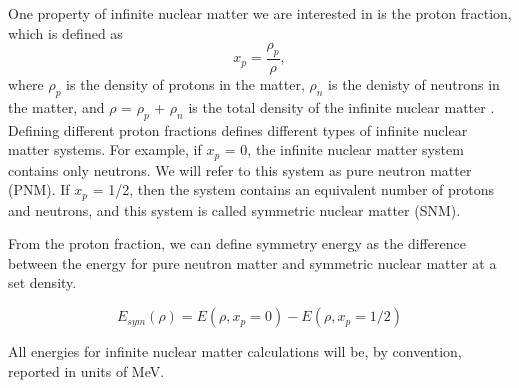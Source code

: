 One property of infinite nuclear matter we are interested in is the proton fraction, which is defined as 
\begin{equation}\label{proton_fraction}
    x_p = \frac{\rho_p}{\rho},
\end{equation}
where $\rho_p$ is the density of protons in the matter, $\rho_n$ is the denisty of neutrons in the matter, and $\rho$ = $\rho_p$ + $\rho_n$ is the total density of the infinite nuclear matter \cite{Ref3}.  Defining different proton fractions defines different types of infinite nuclear matter systems. For example, if $x_p$ = 0, the infinite nuclear matter system contains only neutrons. We will refer to this system as pure neutron matter (PNM). If $x_p$ = 1/2, then the system contains an equivalent number of protons and neutrons, and this system is called symmetric nuclear matter (SNM). 

From the proton fraction, we can define symmetry energy as the difference between the energy for pure neutron matter and symmetric nuclear matter at a set density. \cite{Ref3}

\begin{equation}
    E_{sym}(\rho) = E(\rho, x_p=0) - E(\rho, x_p=1/2) 
\end{equation}

All energies for infinite nuclear matter calculations will be, by convention, reported in units of MeV.